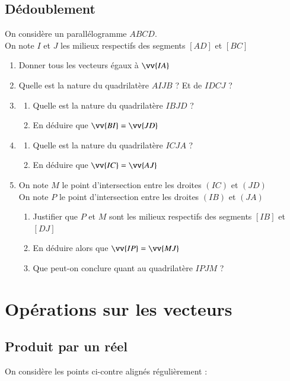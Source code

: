 \documentclass[oneside,12pt]{article}          %
\begin{document}
\subsection{Dédoublement}
On considère un parallélogramme $ABCD$. \\
On note $I$ et $J$ les milieux respectifs des segments $[AD]$ et $[BC]$
\begin{enumerate}
	\item Donner tous les vecteurs égaux à $\vv{IA}$
	\item Quelle est la nature du quadrilatère $AIJB$ ? Et de $IDCJ$ ?
	\item \begin{enumerate}
		\item Quelle est la nature du quadrilatère $IBJD$ ?
		\item En déduire que $\vv{BI}=\vv{JD}$
	\end{enumerate}
	\item \begin{enumerate}
		\item Quelle est la nature du quadrilatère $ICJA$ ?
		\item En déduire que $\vv{IC}=\vv{AJ}$
	\end{enumerate}
	\item On note $M$ le point d'intersection entre les droites $(IC)$ et $(JD)$ \\
	On note $P$ le point d'intersection entre les droites $(IB)$ et $(JA)$
	\begin{enumerate}
		\item Justifier que $P$ et $M$ sont les milieux respectifs des segments $[IB]$ et $[DJ]$
		\item En déduire alors que $\vv{IP}=\vv{MJ}$
		\item Que peut-on conclure quant au quadrilatère $IPJM$ ?
	\end{enumerate}
\end{enumerate}



\section{Opérations sur les vecteurs}

\subsection{Produit par un réel}
On considère les points ci-contre alignés régulièrement :
\end{document}
